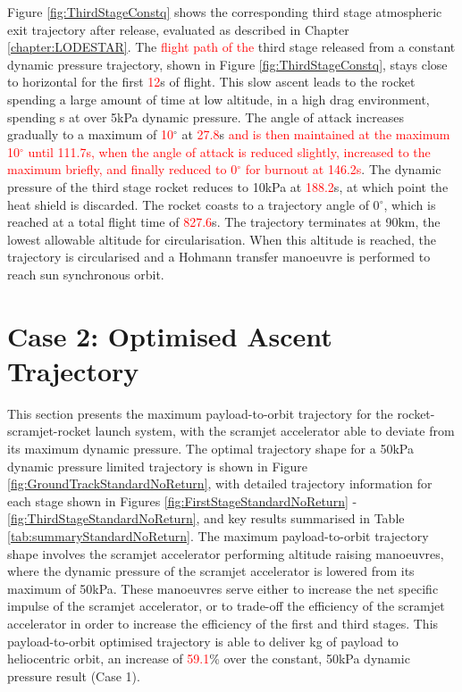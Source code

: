 Figure \ref{fig:ThirdStageConstq} shows the corresponding third stage atmospheric exit trajectory after release, evaluated as described in Chapter \ref{chapter:LODESTAR}. The \textcolor{red}{flight path of the} third stage released from a constant dynamic pressure trajectory, shown in Figure \ref{fig:ThirdStageConstq}, stays close to horizontal for the first \textcolor{red}{12}s of flight. This slow ascent leads to the rocket spending a large amount of time at low altitude, in a high drag environment, spending \thirdqOverFiveConstqNoReturn s at over 5kPa dynamic pressure. The angle of attack increases gradually to a maximum of \textcolor{red}{10}$^\circ$ at \textcolor{red}{27.8}s \textcolor{red}{and is then maintained at the maximum 10$^\circ$ until 111.7s, when the angle of attack is reduced slightly, increased to the maximum briefly, and finally reduced to 0$^\circ$ for burnout at 146.2s}. The dynamic pressure of the third stage rocket reduces to 10kPa at \textcolor{red}{188.2}s, at which point the heat shield is discarded. The rocket coasts to a trajectory angle of 0$^\circ$, which is reached at a total flight time of \textcolor{red}{827.6}s. The trajectory terminates at 90km, the lowest allowable altitude for circularisation. 
When this altitude is reached, the trajectory is circularised and a Hohmann transfer manoeuvre is performed to reach sun synchronous orbit.






\section{Case 2: Optimised Ascent Trajectory}\label{sec:optimisednoreturn}

This section presents the maximum payload-to-orbit trajectory for the rocket-scramjet-rocket launch system, with the scramjet accelerator able to deviate from its maximum dynamic pressure. 
The optimal trajectory shape for a 50kPa dynamic pressure limited trajectory is shown in Figure \ref{fig:GroundTrackStandardNoReturn}, with detailed trajectory information for each stage shown in Figures \ref{fig:FirstStageStandardNoReturn} - \ref{fig:ThirdStageStandardNoReturn}, and key results summarised in Table \ref{tab:summaryStandardNoReturn}. The maximum payload-to-orbit trajectory shape involves the scramjet accelerator performing altitude raising manoeuvres, where the dynamic pressure of the scramjet accelerator is lowered from its maximum of 50kPa. These manoeuvres serve either to increase the net specific impulse of the scramjet accelerator, or to trade-off the efficiency of the scramjet accelerator in order to increase the efficiency of the first and third stages. 
This payload-to-orbit optimised trajectory is able to deliver \PayloadToOrbitStandardNoReturn kg of payload to heliocentric orbit, an increase of \textcolor{red}{59.1}\% over the constant, 50kPa dynamic pressure result (Case 1).

